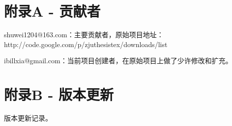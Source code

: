 \chapter{附录A - 贡献者}

shuwei1204@163.com：主要贡献者，原始项目地址： \\
http://code.google.com/p/zjuthesistex/downloads/list 

ibillxia@gmail.com：当前项目创建者，在原始项目上做了少许修改和扩充。

\chapter{附录B - 版本更新}
版本更新记录。


